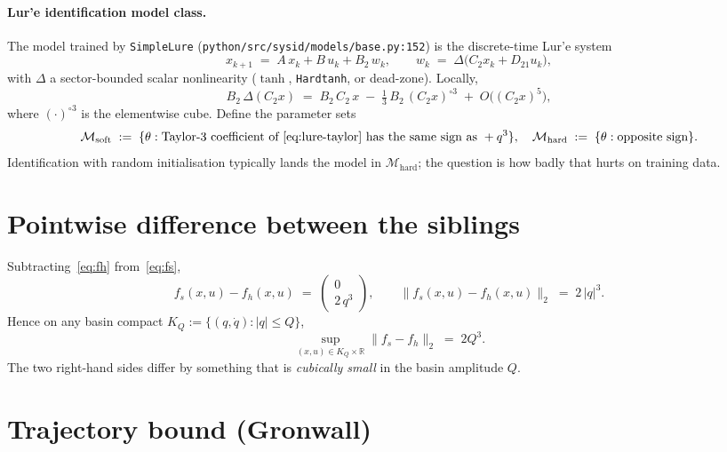 \documentclass[11pt]{article}
\newcommand{\R}{\mathbb{R}}
\newcommand{\Mhard}{\mathcal{M}_{\mathrm{hard}}}
\newcommand{\Msoft}{\mathcal{M}_{\mathrm{soft}}}
\begin{document}
\paragraph{Lur'e identification model class.}
The model trained by \texttt{SimpleLure}
(\texttt{python/src/sysid/models/base.py:152}) is the discrete-time
Lur'e system
\begin{equation}
x_{k+1} \;=\; A\, x_k + B\, u_k + B_2\, w_k,
\qquad
w_k \;=\; \Delta\!\bigl(C_2 x_k + D_{21} u_k\bigr),
\label{eq:lure}
\end{equation}
with \(\Delta\) a sector-bounded scalar nonlinearity (\(\tanh\),
\texttt{Hardtanh}, or dead-zone). Locally,
\begin{equation}
B_2\,\Delta(C_2 x)
\;=\; B_2\, C_2\, x
\;-\; \tfrac{1}{3}\, B_2\, (C_2 x)^{\circ 3}
\;+\; O\bigl((C_2 x)^{5}\bigr),
\label{eq:lure-taylor}
\end{equation}
where \((\cdot)^{\circ 3}\) is the elementwise cube. Define the
parameter sets
\[
\Msoft \;:=\; \{\theta : \text{Taylor-3 coefficient of \eqref{eq:lure-taylor}
                              has the same sign as }+q^3\},
\quad
\Mhard \;:=\; \{\theta : \text{opposite sign}\}.
\]
Identification with random initialisation typically lands the model
in \(\Mhard\); the question is how badly that hurts on training data.

\section{Pointwise difference between the siblings}

Subtracting~\eqref{eq:fh} from~\eqref{eq:fs},
\begin{equation}
f_s(x, u) - f_h(x, u)
\;=\;
\begin{pmatrix} 0 \\ 2\, q^{3} \end{pmatrix},
\qquad
\bigl\| f_s(x,u) - f_h(x,u) \bigr\|_2 \;=\; 2 \,|q|^{3}.
\label{eq:pointwise}
\end{equation}
Hence on any basin compact \(K_Q := \{(q,\dot q): |q| \le Q\}\),
\begin{equation}
\sup_{(x,u) \in K_Q \times \R} \bigl\| f_s - f_h \bigr\|_2
\;=\; 2 Q^{3}.
\label{eq:sup-pointwise}
\end{equation}
The two right-hand sides differ by something that is \emph{cubically
small} in the basin amplitude \(Q\).

\section{Trajectory bound (Gronwall)}
\end{document}
